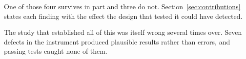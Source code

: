 One of those four survives in part and three do not. Section~\ref{sec:contributions} states each
finding with the effect the design that tested it could have detected.

The study that established all of this was itself wrong several times over. Seven defects in the
instrument produced plausible results rather than errors, and  passing tests caught
none of them.
